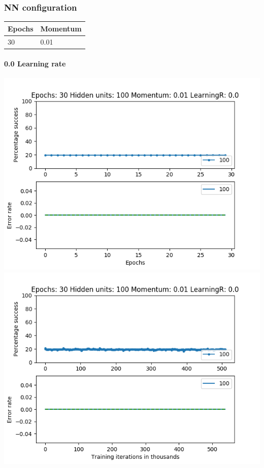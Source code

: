 \documentclass[11pt]{article}
\makeatletter
\def\maxwidth{\ifdim\Gin@nat@width>\linewidth\linewidth
    \else\Gin@nat@width\fi}
\let\Oldincludegraphics\includegraphics
\renewcommand{\includegraphics}[1]{\Oldincludegraphics[width=.8\maxwidth]{#1}}
\makeatother
\begin{document}
    \hypertarget{nn-configuration}{%
\subsubsection{NN configuration}\label{nn-configuration}}

\begin{longtable}[]{@{}ll@{}}
\toprule
Epochs & Momentum\tabularnewline
\midrule
\endhead
30 & 0.01\tabularnewline
\bottomrule
\end{longtable}

\hypertarget{learning-rate}{%
\paragraph{0.0 Learning rate}\label{learning-rate}}

\includegraphics{Experiment2/E2_NN_Epoch_Momentum_0.01_30Epochs_100_LR_0.0_Hiddenunits.png}
\includegraphics{Experiment2/E2_NN_Training_Momentum_0.01_30Epochs_100_LR_0.0_Hiddenunits.png}
\end{document}
